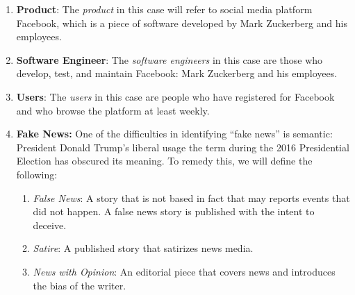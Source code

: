 
\begin{enumerate}

\item{\textbf{Product}: The \emph{product} in this case will refer to social media platform Facebook, which is a piece of software developed by Mark Zuckerberg and his employees.
}

\item{\textbf{Software Engineer}: The \emph{software engineers} in this case are those who develop, test, and maintain Facebook: Mark Zuckerberg and his employees.
}

\item{\textbf{Users}: The \emph{users} in this case are people who have registered for Facebook and who browse the platform at least weekly.
}

\item{\textbf{Fake News:} One of the difficulties in identifying ``fake news'' is semantic: President Donald Trump's liberal usage the term during the 2016 Presidential Election has obscured its meaning. \cite{npr_fake_news} To remedy this, we will define the following:
\begin{enumerate}
    \item{\emph{False News}: A story that is not based in fact that may reports events that did not happen. A false news story is published with the intent to deceive. \cite{ted_becka}}
    \item{\emph{Satire}: A published story that satirizes news media. \cite{ted_becka}}
    \item{\emph{News with Opinion}: An editorial piece that covers news and introduces the bias of the writer. \cite{ted_becka}}
\end{enumerate}
}

\end{enumerate}
